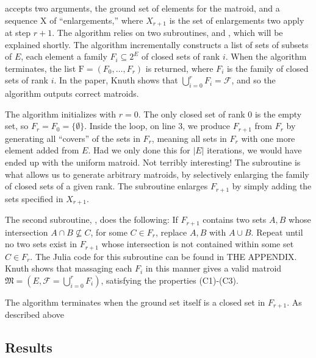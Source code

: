  accepts two arguments, the ground set of elements for the matroid, and a sequence $\mathrm{X}$ of ``enlargements,'' where $X_{r+1}$ is the set of enlargements two apply at step $r+1$. The algorithm relies on two subroutines,  and , which will be explained shortly. The algorithm incrementally constructs a list of sets of subsets of $E$, each element a family $F_i \subseteq 2^E$ of closed sets of rank $i$. When the algorithm terminates, the list $\mathrm{F} = (F_0, \ldots, F_r)$ is returned, where $F_i$ is the family of closed sets of rank $i$. In the paper, Knuth shows that $\bigcup_{i=0}^r F_i = \mathcal{F}$, and so the algorithm outputs correct matroids.

The algorithm initializes with $r = 0$. The only closed set of rank 0 is the empty set, so $F_r = F_0 = \{ \emptyset \}$. Inside the loop, on line 3, we produce $F_{r+1}$ from $F_r$ by generating all ``covers'' of the sets in $F_r$, meaning all sets in $F_r$ with one more element added from $E$. Had we only done this for $|E|$ iterations, we would have ended up with the uniform matroid. Not terribly interesting! The  subroutine is what allows us to generate arbitrary matroids, by selectively enlarging the family of closed sets of a given rank. The subroutine enlarges $F_{r+1}$ by simply adding the sets specified in $X_{r+1}$.

The second subroutine, , does the following: If $F_{r+1}$ contains two sets $A,B$ whose intersection $A \cap B \not \subseteq C$, for some $C \in F_{r}$, replace $A,B$ with $A \cup B$. Repeat until no two sets exist in $F_{r+1}$ whose intersection is not contained within some set $C \in F_{r}$. The Julia code for this subroutine can be found in THE APPENDIX. Knuth shows that massaging each $F_{i}$ in this manner gives a valid matroid $\mathfrak{M} = (E, \mathcal{F} = \bigcup_{i=0}^r F_i)$, satisfying the properties (C1)-(C3).

The algorithm terminates when the ground set itself is a closed set in $F_{r+1}$. As described above

\skelpars[8]{}


\subsection*{Results}
\begin{table*}[ht]
  \centering
  \skelcaption[1]{}
  \skeltabular[10]
\end{table*}
\skelpars[4]{}